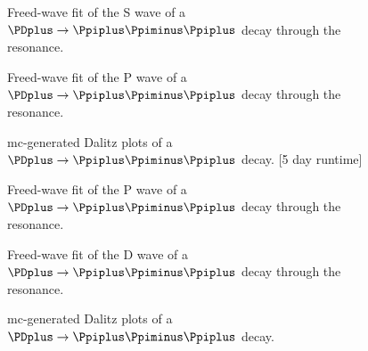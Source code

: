     \begin{figure}
        \centering
        \subfloat[][]{}

        \subfloat[][]{}

        \caption{Freed-wave fit of the S wave of a $\PDplus \to \Ppiplus\Ppiminus\Ppiplus$ decay through the \Pfii{} resonance.}
    \end{figure}

    \begin{figure}
        \centering
        \subfloat[][]{}

        \subfloat[][]{}

        \caption{Freed-wave fit of the P wave of a $\PDplus \to \Ppiplus\Ppiminus\Ppiplus$ decay through the \Pfii{} resonance.}
    \end{figure}

    \begin{figure}
        \centering
        \subfloat[][]{}

        \subfloat[][]{}
        \caption{\ac{mc}-generated Dalitz plots of a $\PDplus \to \Ppiplus\Ppiminus\Ppiplus$ decay. [5 day runtime]}
    \end{figure}

    \begin{figure}
        \centering
        \subfloat[][]{}

        \subfloat[][]{}

        \caption{Freed-wave fit of the P wave of a $\PDplus \to \Ppiplus\Ppiminus\Ppiplus$ decay through the \Prhozero{} resonance.}
    \end{figure}
    \begin{figure}
        \centering
        \subfloat[][]{}

        \subfloat[][]{}

        \caption{Freed-wave fit of the D wave of a $\PDplus \to \Ppiplus\Ppiminus\Ppiplus$ decay through the \Pfii{} resonance.}
    \end{figure}
    \begin{figure}
        \centering

        \caption{\ac{mc}-generated Dalitz plots of a $\PDplus \to \Ppiplus\Ppiminus\Ppiplus$ decay.}
    \end{figure}

